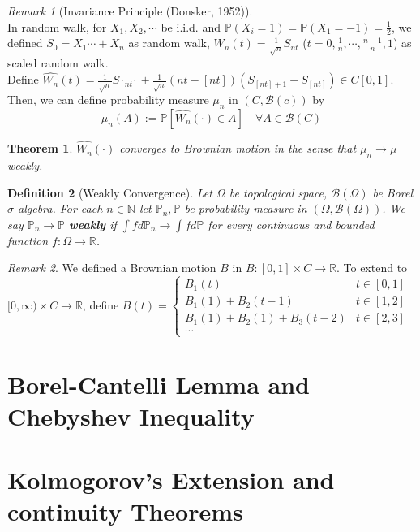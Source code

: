 \documentclass[12pt]{report}
\newcommand{\R}{\mathbb{R}}
\renewcommand{\P}{\mathbb{P}}
\renewcommand{\1}{\mathbb{1}}
\renewcommand{\O}{\Omega}
\theoremstyle{break}
\newtheorem{thm}{Theorem}[section] %
\theoremstyle{newdef}
\newtheorem{defn}[thm]{Definition} %
\theoremstyle{remark}
\newtheorem*{rem}{Remark} %
\begin{document}
\begin{rem}[Invariance Principle (Donsker, 1952)]
\leavevmode\\
In random walk, for $X_1, X_2, \cdots$ be i.i.d. and $\P(X_i = 1) = \P(X_1 = -1) = \frac{1}{2}$,
we defined $S_0 = X_1 \cdots + X_n$ as random walk, $W_n(t) = \frac{1}{\sqrt n}S_{nt}$ ($t = 0,\frac{1}{n},\cdots,\frac{n-1}{n},1$) as scaled random walk.\\
Define $\widehat{W_n}(t) = \frac{1}{\sqrt{n}}S_{[nt]} + \frac{1}{\sqrt n} (nt - [nt])(S_{[nt]+1} - S_{[nt]}) \in C[0,1]$.
Then, we can define probability measure $\mu_n$ in $(C,\mathcal{B}(c))$ by
$$\mu_n(A) := \P \left[ \widehat{W_n}(\cdot) \in A\right] \quad \forall A \in \mathcal{B}(C)$$
\end{rem}


\begin{thm}
$\widehat{W_n}(\cdot)$ converges to Brownian motion in the sense that $\mu_n \rightarrow \mu$ weakly.
\end{thm}

\begin{defn}[Weakly Convergence]
Let $\O$ be topological space, $\mathcal{B}(\O)$ be Borel $\sigma$-algebra.
For each $n \in \mathbb{N}$ let $\P_n, \P$ be probability measure in $(\O,\mathcal{B}(\O))$.
We say $\P_n \rightarrow \P$ \textbf{weakly} if $\int fd\P_n \rightarrow \int fd\P$ for every continuous and bounded function $f : \O \rightarrow \R$.
\end{defn}


\begin{rem}
We defined a Brownian motion $B$ in $B : [0,1] \times C \rightarrow \R$.
To extend to $[0,\infty) \times C \rightarrow \R$, define
$B(t) =
\begin{cases}
B_1(t) & t \in [0,1]\\
B_1(1) + B_2(t-1) & t \in [1,2]\\
B_1(1) + B_2(1)  + B_3(t-2)& t \in [2,3]\\
\cdots
\end{cases}
$
\end{rem}

\section{Borel-Cantelli Lemma and Chebyshev Inequality}
\section{Kolmogorov's Extension and continuity Theorems}
\end{document}
